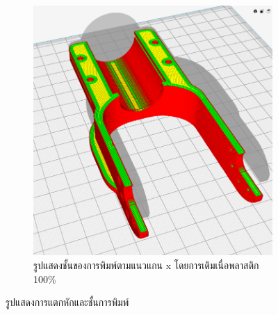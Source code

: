 \begin{figure}[!ht]
\begin{subfigure}[b]{0.4\linewidth}
        \includegraphics[width=\linewidth]{chapter4/images/fatigue3.png}
        \caption{รูปแสดงชั้นของการพิมพ์ตามแนวแกน x โดยการเติมเนื่อพลาสติก 100\%}
    \end{subfigure}
    \caption{รูปแสดงการแตกหักและชั้นการพิมพ์}
    \label{fig:fatiguelayer}
  \end{figure}


